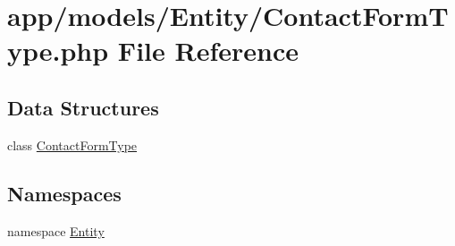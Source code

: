 \hypertarget{_contact_form_type_8php}{\section{app/models/\-Entity/\-Contact\-Form\-Type.php File Reference}
\label{_contact_form_type_8php}
}
\subsection*{Data Structures}
\begin{DoxyCompactItemize}
\item 
class \hyperlink{class_entity_1_1_contact_form_type}{Contact\-Form\-Type}
\end{DoxyCompactItemize}
\subsection*{Namespaces}
\begin{DoxyCompactItemize}
\item 
namespace \hyperlink{namespace_entity}{Entity}
\end{DoxyCompactItemize}
